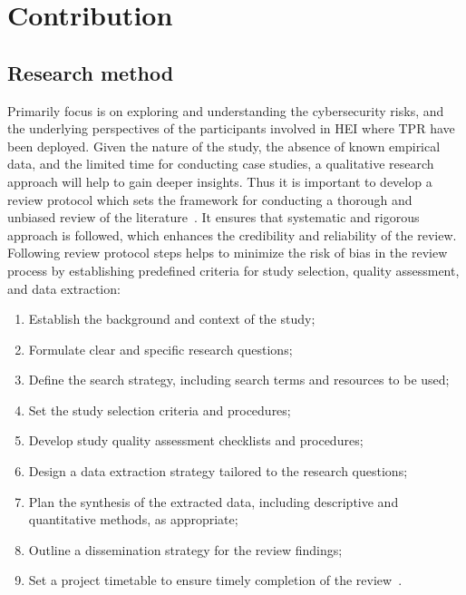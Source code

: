 
\newpage


\section{Contribution}\label{sec:contribution}


\subsection{Research method}\label{subsec:research-method}

Primarily focus is on exploring and understanding the cybersecurity risks, and the underlying perspectives of the participants
involved in \ac{HEI} where \ac{TPR} have been deployed. Given
the nature of the study, the absence of known empirical data, and the limited time for conducting case studies, a qualitative research
approach
will help to gain deeper insights. Thus it is important to develop a review protocol which sets the framework for conducting a thorough and
unbiased review of the literature~\cite[8]{systematic_review_2004}. It ensures that
systematic and rigorous approach is followed, which enhances the credibility and reliability of the review. Following review protocol steps
helps
to minimize the risk of bias in the review process by establishing predefined criteria for study selection, quality assessment, and data
extraction:

\begin{enumerate}
  \item Establish the background and context of the study;
  \item Formulate clear and specific research questions;
  \item Define the search strategy, including search terms and resources to be used;
  \item Set the study selection criteria and procedures;
  \item Develop study quality assessment checklists and procedures;
  \item Design a data extraction strategy tailored to the research questions;
  \item Plan the synthesis of the extracted data, including descriptive and quantitative methods, as appropriate;
  \item Outline a dissemination strategy for the review findings;
  \item Set a project timetable to ensure timely completion of the review~\cite[4-5]{systematic_review_2004}.
\end{enumerate}


